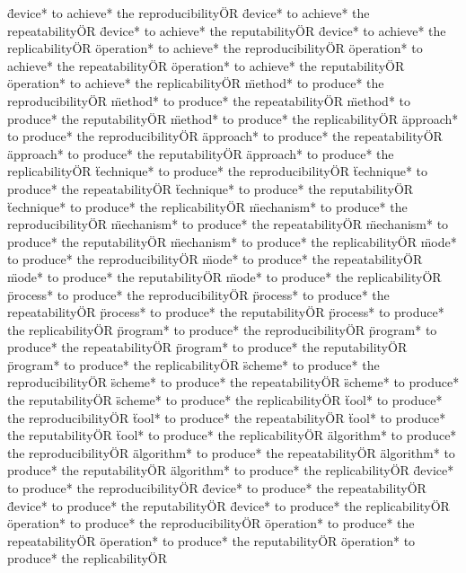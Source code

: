 \documentclass[
10pt, %
a4paper, %
oneside, %
headinclude,footinclude, %
BCOR5mm, %
]{scrartcl}
\begin{document}
\"device* to achieve* the reproducibility\" OR \"device* to achieve* the repeatability\" OR \"device* to achieve* the reputability\" OR \"device* to achieve* the replicability\" OR 
\"operation* to achieve* the reproducibility\" OR \"operation* to achieve* the repeatability\" OR \"operation* to achieve* the reputability\" OR \"operation* to achieve* the replicability\" OR 
\"method* to produce* the reproducibility\" OR \"method* to produce* the repeatability\" OR \"method* to produce* the reputability\" OR \"method* to produce* the replicability\" OR 
\"approach* to produce* the reproducibility\" OR \"approach* to produce* the repeatability\" OR \"approach* to produce* the reputability\" OR \"approach* to produce* the replicability\" OR 
\"technique* to produce* the reproducibility\" OR \"technique* to produce* the repeatability\" OR \"technique* to produce* the reputability\" OR \"technique* to produce* the replicability\" OR 
\"mechanism* to produce* the reproducibility\" OR \"mechanism* to produce* the repeatability\" OR \"mechanism* to produce* the reputability\" OR \"mechanism* to produce* the replicability\" OR 
\"mode* to produce* the reproducibility\" OR \"mode* to produce* the repeatability\" OR \"mode* to produce* the reputability\" OR \"mode* to produce* the replicability\" OR 
\"process* to produce* the reproducibility\" OR \"process* to produce* the repeatability\" OR \"process* to produce* the reputability\" OR \"process* to produce* the replicability\" OR 
\"program* to produce* the reproducibility\" OR \"program* to produce* the repeatability\" OR \"program* to produce* the reputability\" OR \"program* to produce* the replicability\" OR 
\"scheme* to produce* the reproducibility\" OR \"scheme* to produce* the repeatability\" OR \"scheme* to produce* the reputability\" OR \"scheme* to produce* the replicability\" OR 
\"tool* to produce* the reproducibility\" OR \"tool* to produce* the repeatability\" OR \"tool* to produce* the reputability\" OR \"tool* to produce* the replicability\" OR 
\"algorithm* to produce* the reproducibility\" OR \"algorithm* to produce* the repeatability\" OR \"algorithm* to produce* the reputability\" OR \"algorithm* to produce* the replicability\" OR 
\"device* to produce* the reproducibility\" OR \"device* to produce* the repeatability\" OR \"device* to produce* the reputability\" OR \"device* to produce* the replicability\" OR 
\"operation* to produce* the reproducibility\" OR \"operation* to produce* the repeatability\" OR \"operation* to produce* the reputability\" OR \"operation* to produce* the replicability\" OR 
\end{document}

